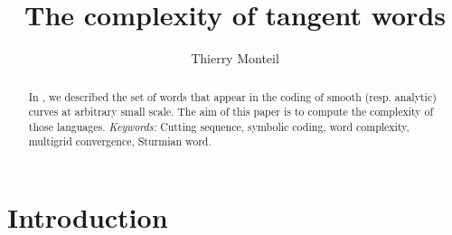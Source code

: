 \documentclass[preliminary]{eptcs}
\author{Thierry Monteil
\institute{CNRS -- Université Montpellier 2\\
\burl{http://www.lirmm.fr/~monteil}}
}
\title{The complexity of tangent words}
\date{}
\begin{document}
\newcommand{\qed}{\hfill $\square$}

\maketitle


\begin{abstract}
In \cite{MonteilDGCI2011}, we described the set of words that appear in
the coding of smooth (resp. analytic) curves at arbitrary small scale. The
aim of this paper is to compute the complexity of those languages.
\newline \newline
\emph{Keywords:} Cutting sequence, symbolic coding, word complexity,
multigrid convergence, Sturmian word.
\end{abstract}


\section{Introduction}
\end{document}
